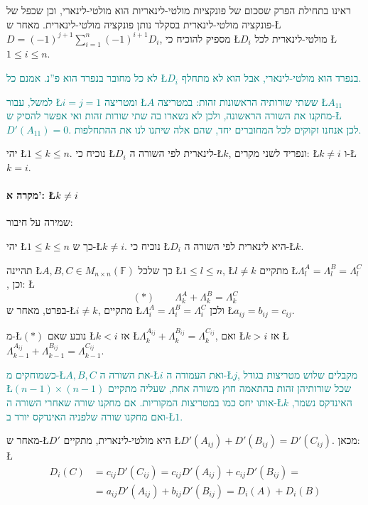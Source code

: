 \documentclass[english,hebrew]{article}
\begin{document}
ראינו בתחילת הפרק שסכום של פונקציות מולטי-לינאריות הוא מולטי-לינארי,
וכן שכפל של פונקציה מולטי-לינארית בסקלר נותן פונקציה מולטי-לינארית.
מאחר ש-\L{$D=(-1)^{j+1}\sum_{i=1}^{n}(-1)^{i+1}D_{i}$}, מספיק להוכיח
כי \L{$D_{i}$} מולטי-לינארית לכל \L{$1\le i\le n$}.

\textcolor{teal}{לא כל מחובר בנפרד הוא פ\textquotedblright נ. אמנם
כל \L{$D_{i}$} בנפרד הוא מולטי-לינארי, אבל הוא לא מתחלף.}

\textcolor{teal}{למשל, עבור \L{$i=j=1$} ומטריצה \L{$A$} ששתי שורותיה
הראשונות זהות: במטריצה \L{$A_{11}$} מחקנו את השורה הראשונה, ולכן
לא נשארו בה שתי שורות זהות ואי אפשר להסיק ש-\L{$D'(A_{11})=0$}. לכן
אנחנו זקוקים לכל המחוברים יחד, שהם אלה שיתנו לנו את ההתחלפות.}

\medskip{}

יהי \L{$1\le k\le n$}. נוכיח כי \L{$D_{i}$} לינארית לפי השורה ה-\L{$k$},
ונפריד לשני מקרים: \L{$k\neq i$} ו-\L{$k=i$}.

\paragraph*{מקרה א': \L{$k\protect\neq i$}}

שמירה על חיבור:

יהי \L{$1\le k\le n$} כך ש-\L{$k\neq i$}. נוכיח כי \L{$D_{i}$}
היא לינארית לפי השורה ה-\L{$k$}.

תהיינה \L{$A,B,C\in M_{n\times n}(\mathbb{F})$} כך שלכל \L{$1\le l\le n$},
\L{$l\neq k$} מתקיים \L{$\Lambda_{l}^{A}=\Lambda_{l}^{B}=\Lambda_{l}^{C}$},
וכן: \L{%
\[
(*)\qquad\Lambda_{k}^{A}+\Lambda_{k}^{B}=\Lambda_{k}^{C}
\]
}%
בפרט, מאחר ש-\L{$i\neq k$}, מתקיים \L{$\Lambda_{i}^{A}=\Lambda_{i}^{B}=\Lambda_{i}^{C}$}
ולכן \L{$a_{ij}=b_{ij}=c_{ij}$}.

מ-\L{$(*)$} נובע שאם \L{$k<i$} אז \L{$\Lambda_{k}^{A_{ij}}+\Lambda_{k}^{B_{ij}}=\Lambda_{k}^{C_{ij}}$},
ואם \L{$k>i$} אז \L{$\Lambda_{k-1}^{A_{ij}}+\Lambda_{k-1}^{B_{ij}}=\Lambda_{k-1}^{C_{ij}}$}.

\textcolor{teal}{כשמוחקים מ-\L{$A,B,C$} את השורה ה-\L{$i$} ואת העמודה
ה-\L{$j$}, מקבלים שלוש מטריצות בגודל \L{$(n-1)\times(n-1)$} שכל
שורותיהן זהות בהתאמה חוץ משורה אחת, שעליה מתקיים אותו יחס כמו במטריצות
המקוריות. אם מחקנו שורה שאחרי השורה ה-\L{$k$} האינדקס נשמר, ואם מחקנו
שורה שלפניה האינדקס יורד ב-\L{$1$}.}

מאחר ש-\L{$D'$} היא מולטי-לינארית, מתקיים \L{$D'(A_{ij})+D'(B_{ij})=D'(C_{ij})$}.
מכאן: \L{%
\begin{align*}
D_{i}(C) & =c_{ij}D'(C_{ij})=c_{ij}D'(A_{ij})+c_{ij}D'(B_{ij})=\\
 & =a_{ij}D'(A_{ij})+b_{ij}D'(B_{ij})=D_{i}(A)+D_{i}(B)
\end{align*}
}%
\end{document}
